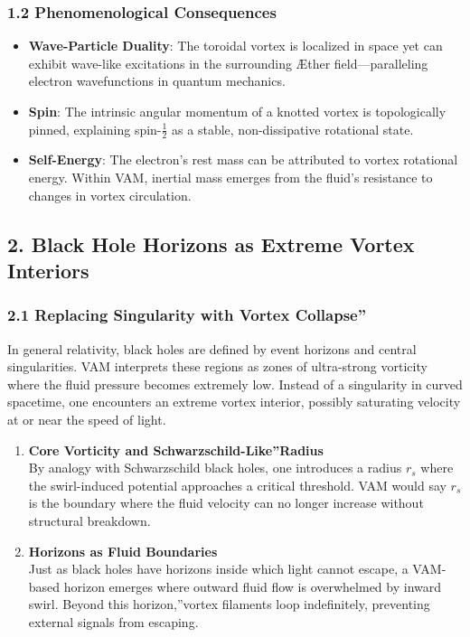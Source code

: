 \documentclass[a4paper,12pt]{article}
\begin{document}
\subsubsection*{1.2 Phenomenological Consequences}
\begin{itemize}
    \item \textbf{Wave-Particle Duality}: The toroidal vortex is localized in space yet can exhibit wave-like excitations in the surrounding Æther field—paralleling electron wavefunctions in quantum mechanics.
    \item \textbf{Spin}: The intrinsic angular momentum of a knotted vortex is topologically pinned, explaining spin-\(\tfrac{1}{2}\) as a stable, non-dissipative rotational state.
    \item \textbf{Self-Energy}: The electron's rest mass can be attributed to vortex rotational energy. Within VAM, inertial mass emerges from the fluid's resistance to changes in vortex circulation.
\end{itemize}


\subsection*{2. Black Hole Horizons as Extreme Vortex Interiors}

\subsubsection*{2.1 Replacing Singularity with \grqq Vortex Collapse\textquotedblright}
In general relativity, black holes are defined by event horizons and central singularities. VAM interprets these regions as zones of ultra-strong vorticity where the fluid pressure becomes extremely low. Instead of a singularity in curved spacetime, one encounters an extreme vortex interior, possibly saturating velocity at or near the speed of light.

\begin{enumerate}
    \item \textbf{Core Vorticity and \grqq Schwarzschild-Like\textquotedblright Radius} \\
    By analogy with Schwarzschild black holes, one introduces a radius \(r_s\) where the swirl-induced potential approaches a critical threshold. VAM would say \(r_s\) is the boundary where the fluid velocity can no longer increase without structural breakdown.
    \item \textbf{Horizons as Fluid Boundaries} \\
    Just as black holes have horizons inside which light cannot escape, a VAM-based horizon emerges where outward fluid flow is overwhelmed by inward swirl. Beyond this \grqq horizon,\textquotedblright vortex filaments loop indefinitely, preventing external signals from escaping.
\end{enumerate}
\end{document}
